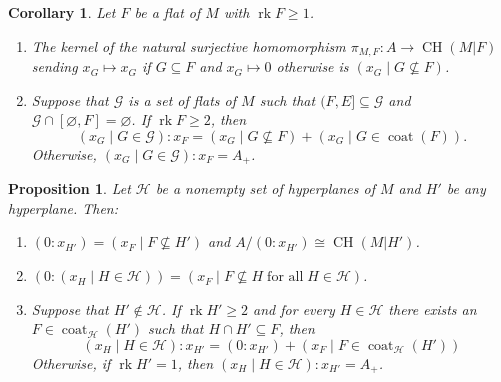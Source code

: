 \documentclass[11pt, reqno]{amsart}
\DeclareMathOperator{\aChow}{CH}             		%
\DeclareMathOperator{\coat}{coat}
\renewcommand{\emptyset}{\varnothing}
\newcommand{\iso}{\cong}
\DeclareMathOperator{\rk}{rk}
\newtheorem{prop}[thm]{Proposition}
\newtheorem{cor}[thm]{Corollary}
\theoremstyle{definition}
\numberwithin{equation}{section}
\numberwithin{table}{section}
\begin{document}
\begin{spacing}{1.1}
\begin{cor} \label{augmented:colons:of:arbitrary:flats}
Let $F$ be a flat of $M$ with $\rk F \geq 1$.
\begin{enumerate}[label = \textnormal{(\alph*)}]
\item \label{augmented:kernel:of:restriction} The kernel of the natural surjective homomorphism $\pi_{M,F}: A \to \aChow(M \vert F)$ sending $x_G \mapsto x_G$ if $G \subseteq F$ and $x_G \mapsto 0$ otherwise is $(x_G \mid G \nsubseteq F)$.
\item \label{augmented:colon:with:filter} Suppose that $\mathcal{G}$ is a set of flats of $M$ such that $(F, E] \subseteq \mathcal{G}$ and $\mathcal{G} \cap [\emptyset, F] = \emptyset$. If $\rk F \geq 2$, then
\[ 
(x_G \mid G \in \mathcal{G}) : x_F = (x_G \mid G \nsubseteq F) + (x_G \mid G \in \coat(F)). 
\]
Otherwise, $(x_G \mid G \in \mathcal{G}) : x_F = A_+$.
\end{enumerate}
\end{cor}


\begin{prop} \label{augmented:colon:computations}
Let $\mathcal{H}$ be a nonempty set of hyperplanes of $M$ and $H'$ be any hyperplane.  Then:
\begin{enumerate}[label = \textnormal{(\alph*)}]

\item  \label{augmented:restriction}
$(0 : x_{H'}) = (x_F \mid F \nsubseteq H' )$ and $A/(0: x_{H'}) \iso \aChow(M\vert H')$.

\item \label{augmented:annihilator:of:hyperplane:ideal}
$(0 : (x_H \mid H \in \mathcal{H})) = (x_F \mid F \nsubseteq H \;\text{for all}\; H \in \mathcal{H})$.

\item \label{augmented:hyperplane:colons}
Suppose that $H' \notin \mathcal{H}$.  If $\rk H' \geq 2$ and for every $H \in \mathcal{H}$ there exists an $F \in \coat_\mathcal{H}(H')$ such that $H \cap H' \subseteq F$, then
\[
(x_H \mid H \in \mathcal{H}) : x_{H'} =  (0 : x_{H'}) + (x_F \mid F \in \coat_\mathcal{H}(H'))
\]
Otherwise, if $\rk H' = 1$, then $(x_H \mid H \in \mathcal{H}) : x_{H'} = A_+$. 

\end{enumerate}
\end{prop}


\end{spacing}
\end{document}
